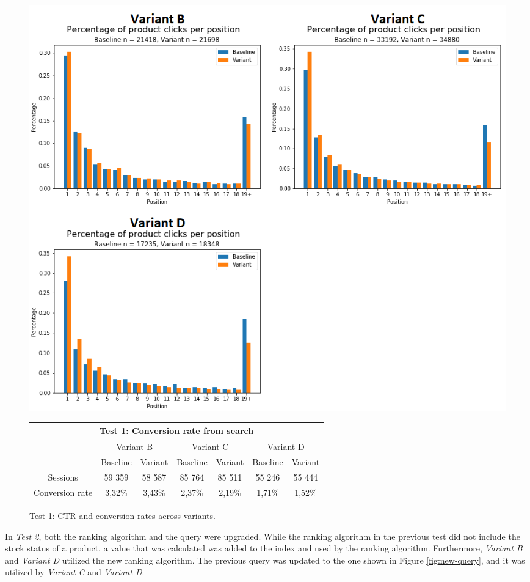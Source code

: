 \begin{figure}
    \centering
    
    \includegraphics[width=\textwidth]{img/search_v1.png}

    \begin{tabular}{|c||c|c||c|c||c|c|}
    \hline
    \multicolumn{7}{|c|}{Test 1: Conversion rate from search} \\ \hline \hline
    & \multicolumn{2}{|c||}{Variant B} & \multicolumn{2}{|c||}{Variant C} & \multicolumn{2}{|c|}{Variant D} \\ \cline{2-7}
    & Baseline & Variant & Baseline & Variant & Baseline & Variant \\ \hline
    Sessions & 59 359 & 58 587 & 85 764 & 85 511 & 55 246 & 55 444 \\ \hline
    Conversion rate & 3,32\% & 3,43\% & 2,37\% & 2,19\% & 1,71\% & 1,52\% \\ \hline
    \end{tabular}

    \caption{Test 1: CTR and conversion rates across variants.}
    \label{fig:search_v1}
\end{figure}



In \emph{Test 2}, both the ranking algorithm and the query were upgraded.
While the ranking algorithm in the previous test did not include the stock status of a product, a value
that was calculated was added to the index and used by the ranking algorithm.
Furthermore, \emph{Variant B} and \emph{Variant D} utilized the new ranking algorithm.
The previous query was updated to the one shown in Figure \ref{fig:new-query}, and it was
utilized by \emph{Variant C} and  \emph{Variant D}.

